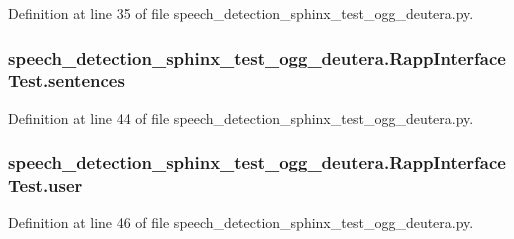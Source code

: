 Definition at line 35 of file speech\-\_\-detection\-\_\-sphinx\-\_\-test\-\_\-ogg\-\_\-deutera.\-py.

\hypertarget{classspeech__detection__sphinx__test__ogg__deutera_1_1RappInterfaceTest_a15e6db1efc70242896e89e06a3de9239}{
\subsubsection[{sentences}]{\setlength{\rightskip}{0pt plus 5cm}speech\-\_\-detection\-\_\-sphinx\-\_\-test\-\_\-ogg\-\_\-deutera.\-Rapp\-Interface\-Test.\-sentences}}\label{classspeech__detection__sphinx__test__ogg__deutera_1_1RappInterfaceTest_a15e6db1efc70242896e89e06a3de9239}


Definition at line 44 of file speech\-\_\-detection\-\_\-sphinx\-\_\-test\-\_\-ogg\-\_\-deutera.\-py.

\hypertarget{classspeech__detection__sphinx__test__ogg__deutera_1_1RappInterfaceTest_a6ea5db18064764bd90a065a01c332516}{
\subsubsection[{user}]{\setlength{\rightskip}{0pt plus 5cm}speech\-\_\-detection\-\_\-sphinx\-\_\-test\-\_\-ogg\-\_\-deutera.\-Rapp\-Interface\-Test.\-user}}\label{classspeech__detection__sphinx__test__ogg__deutera_1_1RappInterfaceTest_a6ea5db18064764bd90a065a01c332516}


Definition at line 46 of file speech\-\_\-detection\-\_\-sphinx\-\_\-test\-\_\-ogg\-\_\-deutera.\-py.

